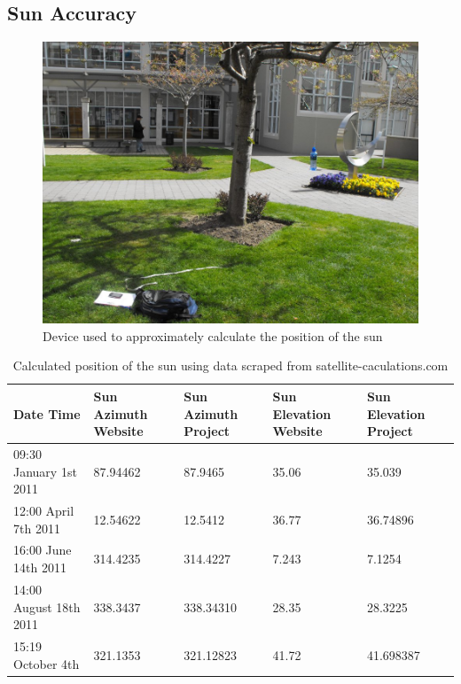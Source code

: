\documentclass[12pt]{report}
\begin{document}

\subsection{Sun Accuracy}

\begin{figure}[h]
\includegraphics[scale=0.4]{contraption.jpg}
\caption{Device used to approximately calculate the position of the sun}
\label{image:sun-contraption}
\end{figure}

\begin{table}
\begin{tabular}{ | l | l | l | l  | l |}
\hline
Date Time & Sun Azimuth Website & Sun Azimuth Project & Sun Elevation Website & Sun Elevation Project\\ \hline
09:30 January 1st 2011 & 87.94462 & 87.9465 & 35.06 & 35.039\\ \hline
12:00 April 7th 2011 & 12.54622 & 12.5412 & 36.77 & 36.74896\\ \hline
16:00 June 14th 2011 & 314.4235 & 314.4227 & 7.243 & 7.1254\\ \hline
14:00 August 18th 2011 & 338.3437 & 338.34310 & 28.35 & 28.3225\\ \hline
15:19 October 4th & 321.1353 & 321.12823 & 41.72 & 41.698387\\ \hline
\end{tabular}
\caption{Calculated position of the sun using data scraped from satellite-caculations.com\cite{solarpos}}
\label{table:websun}
\end{table}
\end{document}
